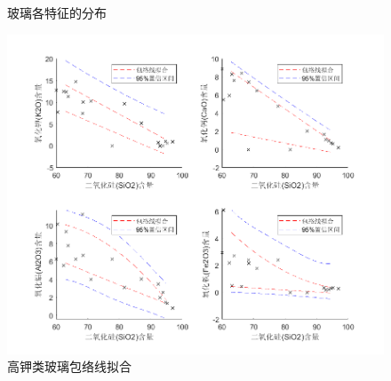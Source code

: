 \documentclass[withoutpreface,bwprint]{cumcmthesis}
\begin{document}
\begin{figure}[H]
	\centering
	\caption{玻璃各特征的分布}
\end{figure}

\begin{figure}[H]
	\centering
	\includegraphics[scale=0.5]{高钾类玻璃包络线拟合.png}
	\caption{高钾类玻璃包络线拟合}
	\label{fig:高钾类玻璃包络线拟合}
\end{figure}
\end{document}
